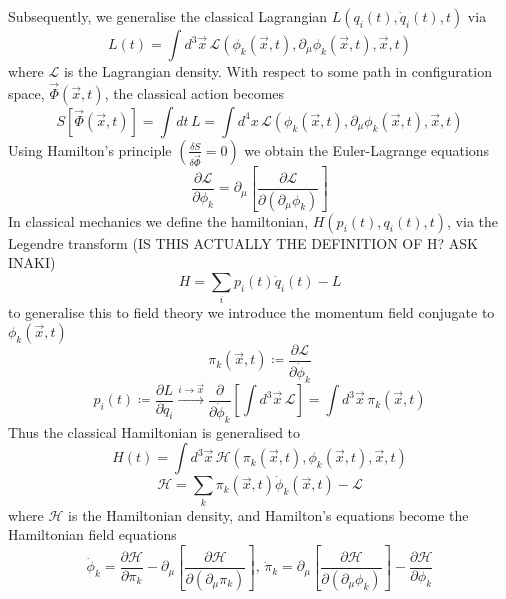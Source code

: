 \documentclass[11pt, a4paper]{article}
\theoremstyle{definition}
\theoremstyle{plain}
\begin{document}
Subsequently, we generalise the classical Lagrangian $L(q_i(t), \dot{q}_i(t), t)$ via
\begin{equation}
  L(t) = \int{d^{3}\vec{x}\,\mathcal{L}(\phi_k(\vec{x}, t),\partial_{\mu}\phi_k(\vec{x}, t), \vec{x}, t)}
\end{equation}
where $\mathcal{L}$ is the Lagrangian density. With respect to some path
in configuration space, $\vec{\Phi}(\vec{x}, t)$, the classical action becomes 
\begin{equation}
  S\left[\vec{\Phi}(\vec{x}, t) \right] = \int{dt\,L} 
  = \int{d^4x\,\mathcal{L}(\phi_k(\vec{x}, t),\partial_{\mu}\phi_k(\vec{x}, t), \vec{x}, t)}
\end{equation}
Using Hamilton's principle $\left( \frac{\delta S}{\delta \vec{\Phi} } = 0 \right)$ we obtain
the Euler-Lagrange equations 
\begin{equation}
  \frac{\partial \mathcal{L}}{\partial \phi_k}
  = \partial_\mu \left[ \frac{\partial \mathcal{L}}{\partial(\partial_\mu{\phi_k}) } \right]
\end{equation}
In classical mechanics we define the hamiltonian, $H(p_i(t), q_i(t), t)$, via the
Legendre transform (IS THIS ACTUALLY THE DEFINITION OF H? ASK INAKI)
\begin{equation}
  H = \sum_{i}{p_i(t)\dot{q}_i(t) - L}
\end{equation}
to generalise this to field theory we introduce the momentum field conjugate to 
$\phi_k(\vec{x}, t)$
\begin{equation}
  \pi_k(\vec{x}, t) \coloneq \frac{\partial \mathcal{L} }{\partial \dot{\phi}_k}
\end{equation}
\begin{equation}
  p_i(t) \coloneq \frac{\partial L}{\partial \dot{q}_i} \xrightarrow{i \rightarrow \vec{x}}
  \frac{\partial}{\partial \dot{\phi}_k} \left[ \int{d^3\vec{x}\,\mathcal{L}} \right]
  = \int{d^3\vec{x}\,\pi_k(\vec{x}, t)}
\end{equation}
Thus the classical Hamiltonian is generalised to
\begin{equation}
  H(t) = \int{d^3\vec{x}\,\mathcal{H}(\pi_k(\vec{x}, t), \phi_k(\vec{x}, t), \vec{x}, t) }
\end{equation}
\begin{equation}
  \mathcal{H} = \sum_{k}{\pi_k(\vec{x}, t)\dot{\phi}_k(\vec{x}, t) - \mathcal{L}}
\end{equation}
where $\mathcal{H}$ is the Hamiltonian density, and Hamilton's equations become
the Hamiltonian field equations
\begin{equation}
  \dot{\phi}_k = \frac{\partial \mathcal{H}}{\partial \pi_k}
  - \partial_\mu \left[ \frac{\partial \mathcal{H}}{\partial (\partial_\mu \pi_k)} \right],\,
  \dot{\pi}_k = \partial_\mu \left[ \frac{\partial \mathcal{H}}{\partial (\partial_\mu \phi_k)} \right]
  - \frac{\partial \mathcal{H}}{\partial \phi_k}
\end{equation}
\end{document}

